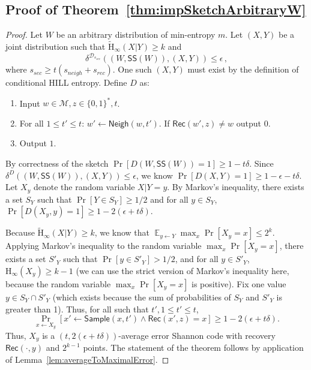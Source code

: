 \documentclass[11pt]{article}
\newcommand{\thref}[1]{\mbox{Theorem~\ref{#1}}}
\newcommand{\lemref}[1]{\mbox{Lemma~\ref{#1}}}
\DeclareMathOperator*{\expe}{\mathbb{E}}
\newcommand{\class}[1]{{\ensuremath{\mathsf{#1}}}}
\newcommand{\sketch}{\ensuremath{\class{SS}}\xspace}
\newcommand{\rec}{\ensuremath{\class{Rec}}\xspace}
\newcommand{\sample}{\ensuremath{\class{Sample}}\xspace}
\newcommand{\neigh}{\ensuremath{\class{Neigh}}\xspace}
\newcommand{\hill}{\ensuremath{\mathtt{HILL}}\xspace}
\newcommand{\Hoo}{\mathrm{H}_\infty}
\newcommand{\Hav}{\tilde{\mathrm{H}}_\infty}
\begin{document}
\subsection{Proof of \thref{thm:impSketchArbitraryW}}
\label{sec:proof of thm sketch implies code}
\begin{proof}
  Let $W$ be an arbitrary distribution of min-entropy $m$.  Let $(X, Y)$ be a joint distribution such that $\Hav(X | Y)\geq k$ and
\[ 
\delta^{\mathcal{D}_{s_{sec}}}((W, \sketch(W)), (X, Y))\le \epsilon\, ,
\]  
where  $s_{sec} \geq t(s_{neigh}+s_{rec})$.  One such $(X, Y)$ must exist by the definition of conditional HILL entropy. 
Define $D$ as:
\begin{enumerate}
\item Input $w\in\mathcal{M}, z \in\{0, 1\}^*, t$.
\item For all $1\leq t'\leq t$: 
\subitem  $w'\leftarrow \neigh(w, t')$.
\subitem If $\rec(w', z) \neq  w$ output $0$.
\item Output $1$.
\end{enumerate}
 By correctness of the sketch $ \Pr[D(W, \sketch(W)) =1]\ge 1-t\delta$.  Since 
$\delta^D((W, \sketch(W)), (X, Y))\le \epsilon$, we know $\Pr[D(X, Y) = 1]\ge 1-\epsilon-t\delta$.  Let $X_y$ denote the random variable $X|Y=y$.  By Markov's inequality,  there exists a set $S_Y$ such that $\Pr[Y\in S_Y]\ge 1/2$ and for all $y\in S_Y$, $\Pr[ D(X_y, y) =1]\ge 1- 2(\epsilon + t\delta)$.  

Because $\Hav(X | Y)\geq k$, we know that $\expe_{y\leftarrow Y} \max_x \Pr[X_y=x]\leq 2^k$.  Applying Markov's inequality to the random variable $\max_x \Pr[X_y=x]$, there exists a set $S'_Y$ such that $\Pr[y\in S'_Y]> 1/2$, and for all $y\in S'_Y$, $\Hoo(X_y)\ge k-1$ (we can use the strict version of Markov's inequality here, because the random variable $\max_x \Pr[X_y=x]$ is positive).  Fix one value $y \in S_Y\cap S'_Y$ (which exists because the sum of probabilities of $S_Y$ and $S'_Y$ is greater than 1).  
Thus, for all such that $t', 1\leq t'\leq t$, 
\[ \Pr_{x\leftarrow X_y}[x'\leftarrow \sample(x, t') \wedge \rec(x',z) = x]\ge  1-2(\epsilon+t\delta).\]  
Thus,  $X_y$ is a $(t, 2(\epsilon+t\delta))$-average error Shannon code with recovery $\rec(\cdot,y)$ and $2^{k-1}$ points.  The statement of the theorem follows by application of \lemref{lem:averageToMaximalError}.  
\end{proof}
\end{document}
